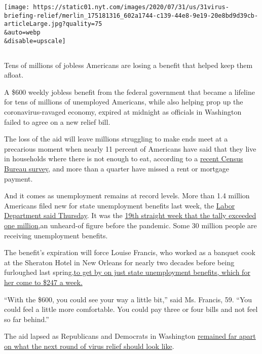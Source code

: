 \texttt{[image: https://static01.nyt.com/images/2020/07/31/us/31virus-briefing-relief/merlin\_175181316\_602a1744-c139-44e8-9e19-20e8bd9d39cb-articleLarge.jpg?quality=75\\\&auto=webp\\\&disable=upscale]}

\subsection{}

Tens of millions of jobless Americans are losing a benefit that helped
keep them afloat.

A \$600 weekly jobless benefit from the federal government that became a
lifeline for tens of millions of unemployed Americans, while also
helping prop up the coronavirus-ravaged economy, expired at midnight as
officials in Washington failed to agree on a new relief bill.

The loss of the aid will leave millions struggling to make ends meet at
a precarious moment when nearly 11 percent of Americans have said that
they live in households where there is not enough to eat, according to a
\href{https://www.census.gov/programs-surveys/household-pulse-survey/data.html?utm_campaign=20200727mspuls1ccdtanl\&utm_medium=email\&utm_source=govdelivery}{recent
Census Bureau survey}, and more than a quarter have missed a rent or
mortgage payment.

And it comes as unemployment remains at record levels. More than 1.4
million Americans filed new for state unemployment benefits last week,
the \href{https://oui.doleta.gov/press/2020/073020.pdf}{Labor Department
said Thursday}. It was the
\href{https://www.nytimes.com/2020/07/30/business/economy/q2-gdp-coronavirus-economy.html}{19th
straight week that the tally exceeded one million,}an unheard-of figure
before the pandemic. Some 30 million people are receiving unemployment
benefits.

The benefit's expiration will force Louise Francis, who worked as a
banquet cook at the Sheraton Hotel in New Orleans for nearly two decades
before being furloughed last
spring,\href{https://www.nytimes.com/2020/07/30/business/economy/q2-gdp-coronavirus-economy.html}{to
get by on just state unemployment benefits, which for her come to \$247
a week.}

``With the \$600, you could see your way a little bit,'' said Ms.
Francis, 59. ``You could feel a little more comfortable. You could pay
three or four bills and not feel so far behind.''

The aid lapsed as Republicans and Democrats in Washington
\href{https://www.nytimes.com/2020/07/28/us/politics/coronavirus-relief-bills-house-senate.html}{remained
far apart on what the next round of virus relief should look like}.

